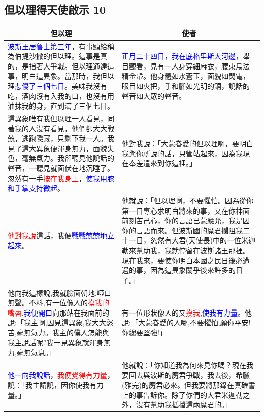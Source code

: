 \subsection{但以理得天使啟示 10}
\begin{table}[H]
\centering
\begin{tabular}{p{6.75cm}|p{10.50cm}}\hline\hline
\multicolumn{1}{c|}{但以理}&\multicolumn{1}{c}{使者}\\\hline
\textcolor{blue}{波斯王居魯士第三年}，有事顯給稱為伯提沙撒的但以理。這事是真的，是指著大爭戰。但以理通達這事，明白這異象。當那時，我但以理\textcolor{blue}{悲傷了三個七日}。美味我沒有吃，酒肉沒有入我的口，也沒有用油抹我的身，直到滿了三個七日。
&\textcolor{blue}{正月二十四日，我在底格里斯大河邊}，舉目觀看，見有一人身穿細麻衣，腰束烏法精金帶。他身體如水蒼玉，面貌如閃電，眼目如火把，手和腳如光明的銅，說話的聲音如大眾的聲音。\\\hline
這異象唯有我但以理一人看見，同著我的人沒有看見，他們卻大大戰兢，逃跑隱藏，只剩下我一人。我見了這大異象便渾身無力，面貌失色，毫無氣力。我卻聽見他說話的聲音，一聽見就面伏在地沉睡了。忽然有一手\textcolor{red}{按在我身上}，\textcolor{blue}{使我用膝和手掌支持微起}。 
&他對我說：「大蒙眷愛的但以理啊，要明白我與你所說的話，只管站起來，因為我現在奉差遣來到你這裡。」\\\hline
\textcolor{red}{他對我說}這話，我便\textcolor{blue}{戰戰兢兢地立起來}。 
&他就說：「但以理啊，不要懼怕。因為從你第一日專心求明白將來的事，又在你神面前刻苦己心，你的言語已蒙應允，我是因你的言語而來。但波斯國的魔君攔阻我二十一日，忽然有大君(天使長)中的一位米迦勒來幫助我，我就停留在波斯諸王那裡。現在我來，要使你明白本國之民日後必遭遇的事，因為這異象關乎後來許多的日子。」 \\\hline
他向我這樣說,我就臉面朝地,啞口無聲。不料,有一位像人的\textcolor{red}{摸我的嘴唇},\textcolor{blue}{我便開口}向那站在我面前的說:「我主啊,因見這異象,我大大愁苦,毫無氣力。我主的僕人怎能與我主說話呢?我一見異象就渾身無力,毫無氣息。」&有一位形狀像人的又\textcolor{red}{摸我},\textcolor{blue}{使我有力量}。他說:「大蒙眷愛的人哪,不要懼怕,願你平安!你總要堅強!」\\\hline
\textcolor{blue}{他一向我說話}，\textcolor{red}{我便覺得有力量}，說：「我主請說，因你使我有力量。」&他就說：「你知道我為何來見你嗎？現在我要回去與波斯的魔君爭戰，我去後，希臘(雅完)的魔君必來。但我要將那錄在真確書上的事告訴你。除了你們的大君米迦勒之外，沒有幫助我抵擋這兩魔君的。」\\\hline
\end{tabular}
\end{table}

